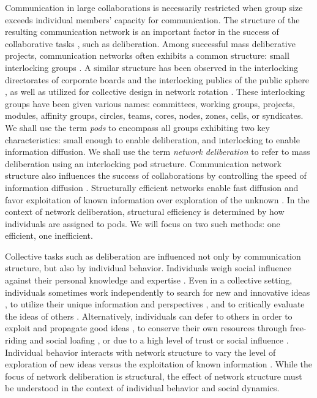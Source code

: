 Communication in large collaborations is necessarily restricted when group size exceeds individual members' capacity for communication. The structure of the resulting communication network is an important factor in the success of collaborative tasks \cite{kearns_experiments_2012, mason_collaborative_2012, mason_propagation_2008}, such as deliberation. Among successful mass deliberative projects, communication networks often exhibits a common structure: small interlocking groups \cite{benkler_coases_2002, gonzalez-bailon_networked_2016, brugh_combining_2019, laloux_reinventing_2014}. A similar structure has been observed in the interlocking directorates of corporate boards \cite{karau_social_1993} and the interlocking publics of the public sphere \cite{habermas_structural_1991}, as well as utilized for collective design in network rotation \cite{salehi_hive_2018}.
These interlocking groups have been given various names: committees, working groups, projects, modules, affinity groups, circles, teams, cores, nodes, zones, cells, or syndicates.
We shall use the term {\em pods} to encompass all groups exhibiting two key characteristics: small enough to enable deliberation, and interlocking to enable information diffusion.
We shall use the term {\em network deliberation} to refer to mass deliberation using an interlocking pod structure.
Communication network structure also influences the success of collaborations by controlling the speed of information diffusion \cite{lazer_network_2007,mason_propagation_2008,mason_collaborative_2012,barkoczi_social_2016, gomez_clustering_2019,derex_partial_2016,kearns_experiments_2012}. Structurally efficient networks enable fast diffusion and favor exploitation of known information over exploration of the unknown \cite{lazer_network_2007, barkoczi_social_2016}. In the context of network deliberation, structural efficiency is determined by how individuals are assigned to pods.
We will focus on two such methods: one efficient, one inefficient.

Collective tasks such as deliberation are influenced not only by communication structure, but also by individual behavior. Individuals weigh social influence against their personal knowledge and expertise  \cite{boyd_culture_1988}. 
Even in a collective setting, individuals sometimes work independently to search for new and innovative ideas \cite{lazer_network_2007, barkoczi_social_2016}, to utilize their unique information and perspectives \cite{hong_interpreted_2009}, and to critically evaluate the ideas of others \cite{rendell_rogersparadox_2010}.
Alternatively, individuals can defer to others in order to exploit and propagate good ideas \cite{barkoczi_social_2016, boyd_culture_1988}, to conserve their own resources through free-riding and social loafing \cite{karau_social_1993}, or due to a high level of trust \cite{salehi_hive_2018} or social influence \cite{banerjee_simple_1992, smith_pathological_2000}. Individual behavior interacts with network structure to vary the level of exploration of new ideas versus the exploitation of known information \cite{barkoczi_social_2016}. While the focus of network deliberation is structural, the effect of network structure must be understood in the context of individual behavior and social dynamics.

